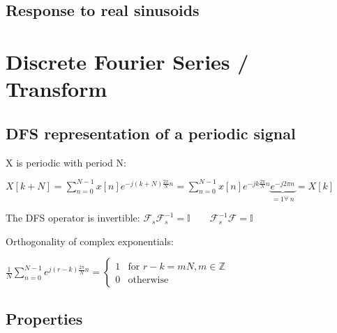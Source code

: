 \documentclass[8pt,a4paper]{scrartcl}
\begin{document}
\begin{multicols*}{3}
\subsection{Response to real sinusoids}



\section{Discrete Fourier Series / Transform}

\subsection{DFS representation of a periodic signal}



X is periodic with period N: 

$X[k+N]=\sum\limits_{n=0}^{N-1}x[n]e^{-j(k+N)\frac{2\pi}{N}n}=\sum\limits_{n=0}^{N-1}x[n]e^{-jk\frac{2\pi}{N}n}\underbrace{e^{-j2\pi n}}_{=1\forall\ n}=X[k]$

The DFS operator is invertible: $\mathcal{F}_s\mathcal{F}_s^{-1}=\mathbb{I}\qquad \mathcal{F}_s^{-1}\mathcal{F}=\mathbb{I}$

Orthogonality of complex exponentials: 

$\frac{1}{N}\sum\limits_{n=0}^{N-1}e^{j(r-k)\frac{2\pi}{N}n}=\begin{cases}1&\text{for } r-k = mN,m\in\mathbb{Z}\\0&\text{otherwise}\end{cases}$

\subsection{Properties}


\end{multicols*}
\end{document}
